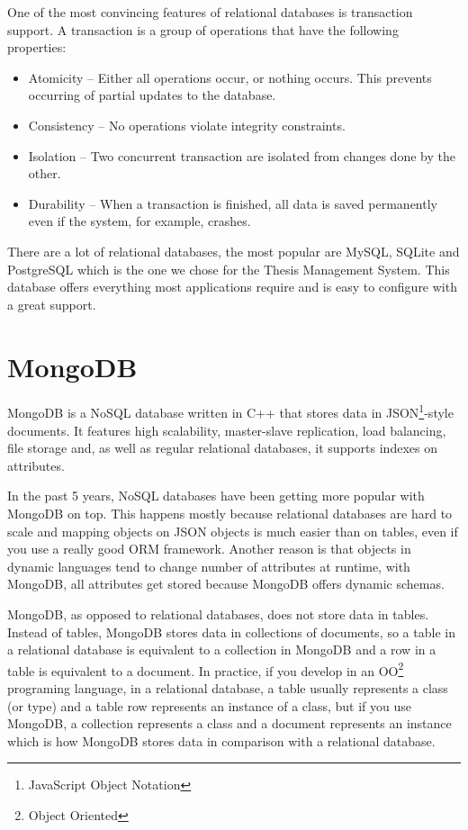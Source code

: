 One of the most convincing features of relational databases is transaction support. A transaction is a group of operations that have the following properties:

\begin{itemize}
    \item Atomicity -- Either all operations occur, or nothing occurs. This prevents occurring of partial updates to the database.
    \item Consistency -- No operations violate integrity constraints.
    \item Isolation -- Two concurrent transaction are isolated from changes done by the other.
    \item Durability -- When a transaction is finished, all data is saved permanently even if the system, for example, crashes.
\end{itemize}

There are a lot of relational databases, the most popular are MySQL, SQLite and PostgreSQL which is the one we chose for the Thesis Management System. This database offers everything most applications require and is easy to configure with a great support.

\section{MongoDB}

MongoDB is a NoSQL database written in C++\cite{mongodb-homepage} that stores data in JSON\footnote{JavaScript Object Notation}-style documents. It features high scalability, master-slave replication, load balancing, file storage and, as well as regular relational databases, it supports indexes on attributes. 

In the past 5 years, NoSQL databases have been getting more popular with MongoDB on top\cite{db-ranking}. This happens mostly because relational databases are hard to scale and mapping objects on JSON objects is much easier than on tables, even if you use a really good ORM framework. Another reason is that objects in dynamic languages tend to change number of attributes at runtime, with MongoDB, all attributes get stored because MongoDB offers dynamic schemas.

MongoDB, as opposed to relational databases, does not store data in tables. Instead of tables, MongoDB stores data in collections of documents, so a table in a relational database is equivalent to a collection in MongoDB and a row in a table is equivalent to a document. In practice, if you develop in an OO\footnote{Object Oriented} programing language, in a relational database, a table usually represents a class (or type) and a table row represents an instance of a class, but if you use MongoDB, a collection represents a class and a document represents an instance which is how MongoDB stores data in comparison with a relational database.

